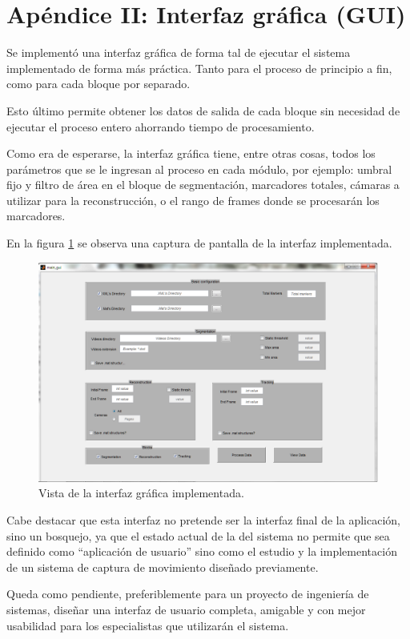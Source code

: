 \section{Apéndice II: Interfaz gráfica (GUI)}

Se implementó una interfaz gráfica de forma tal de ejecutar el sistema implementado de forma más práctica. Tanto para el proceso de principio a fin, como para cada bloque por separado.

Esto último permite obtener los datos de salida de cada bloque sin necesidad de ejecutar el proceso entero ahorrando tiempo de procesamiento.

Como era de esperarse, la interfaz gráfica tiene, entre otras cosas, todos los parámetros que se le ingresan al proceso en cada módulo, por ejemplo: umbral fijo y filtro de área en el bloque de segmentación, marcadores totales, cámaras a utilizar para la reconstrucción, o el rango de frames donde se procesarán los marcadores.

En la figura \ref{guiVent} se observa una captura de pantalla de la interfaz implementada.

\begin{figure}[H]
\begin{center}
\includegraphics[scale=0.6]{img/gui.png}
\end{center}
\caption{Vista de la interfaz gráfica implementada.}
\label{guiVent}
\end{figure}

Cabe destacar que esta interfaz no pretende ser la interfaz final de la aplicación, sino un bosquejo, ya que el estado actual de la del sistema no permite que sea definido como ``aplicación de usuario'' sino como el estudio y la implementación de un sistema de captura de movimiento diseñado previamente.

Queda como pendiente, preferiblemente para un proyecto de ingeniería de sistemas, diseñar una interfaz de usuario completa, amigable y con mejor usabilidad para los especialistas que utilizarán el sistema.